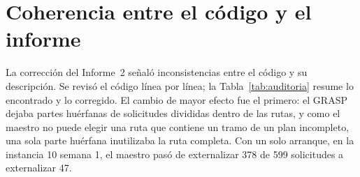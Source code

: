 \section{Coherencia entre el código y el informe}\label{sec:auditoria}

La corrección del Informe~2 señaló inconsistencias entre el código y su descripción. Se revisó el código línea por línea; la Tabla~\ref{tab:auditoria} resume lo encontrado y lo corregido. El cambio de mayor efecto fue el primero: el GRASP dejaba partes huérfanas de solicitudes divididas dentro de las rutas, y como el maestro no puede elegir una ruta que contiene un tramo de un plan incompleto, una sola parte huérfana inutilizaba la ruta completa. Con un solo arranque, en la instancia 10 semana 1, el maestro pasó de externalizar 378 de 599 solicitudes a externalizar 47.

